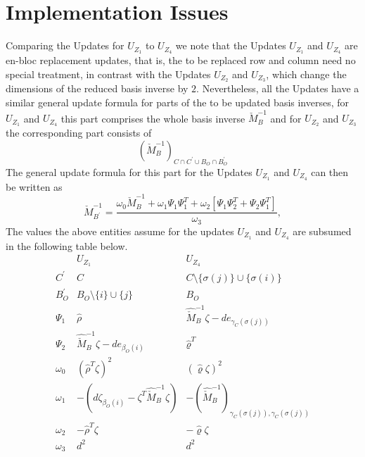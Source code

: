 \documentclass[a4paper]{article}
\begin{document}
\section{Implementation Issues}
Comparing the Updates for $U_{Z_{1}}$ to $U_{Z_{4}}$ we note that the Updates
$U_{Z_{1}}$ and $U_{Z_{4}}$ are en-bloc replacement updates, that is, the to be
replaced row and column need no special treatment, in contrast with the Updates
$U_{Z_{2}}$ and $U_{Z_{3}}$, which change the dimensions of the reduced basis
inverse by $2$. Nevertheless, all the Updates have a similar general update
formula for parts of the to be updated basis inverses,
for $U_{Z_{1}}$ and $U_{Z_{4}}$ this part comprises the whole
basis inverse $\check{M}_{B}^{-1}$ and for $U_{Z_{2}}$
and $U_{Z_{3}}$ the corresponding part consists of  
\begin{equation}
\left(
 \check{M}_{B}^{-1}
\right)_{C \cap C^{\prime} \cup B_{O} \cap B_{O}^{\prime}}
\end{equation}
The general update formula for this part for the Updates
$U_{Z_{1}}$ and $U_{Z_{4}}$ can then be written as 
\begin{equation}
\check{M}_{B^{\prime}}^{-1}
=
\frac{
\omega_{0}\check{M}_{B}^{-1}
+\omega_{1}\Psi_{1}\Psi_{1}^{T}
+\omega_{2}\left[\Psi_{1}\Psi_{2}^{T}+\Psi_{2}\Psi_{1}^{T}\right]
}{\omega_{3}},
\end{equation}
The values the above entities assume for the updates $U_{Z_{1}}$ and
$U_{Z_{4}}$ are subsumed in the following table below.
\begin{equation}
\begin{array}{c|cc}
& U_{Z_{1}} & U_{Z_{4}} \\
\hline
C^{\prime}
& C
& C \setminus \{\sigma(j)\} \cup \{\sigma(i)\}
\\
B_{O}^{\prime}
& B_{O} \setminus \{i\} \cup \{j\}
& B_{O}
\\
\Psi_{1}
& \hat{\rho}
& \hat{\check{M}}_{B}^{-1}\zeta-de_{\gamma_{C}(\sigma(j))}
\\
\Psi_{2}
& \hat{\check{M}}_{B}^{-1}\zeta-de_{\beta_{O}(i)}
& \hat{\varrho}^{T}
\\
\omega_{0}
& \left(\hat{\rho}^{T}\zeta\right)^{2}
& \left(\hat{\varrho}\zeta\right)^{2}
\\
\omega_{1}
& -\left(
   d\zeta_{\beta_{O}(i)}-\zeta^{T}\hat{\check{M}}_{B}^{-1}\zeta
  \right) 
& -\left(
   \hat{\check{M}}_{B}^{-1}
  \right)_{\gamma_{C}(\sigma(j)), \gamma_{C}(\sigma(j))} 
\\
\omega_{2}
& -\hat{\rho}^{T}\zeta
& -\hat{\varrho}\zeta
\\
\omega_{3}
& d^{2}
& d^{2}
\end{array}
\end{equation}
 
\end{document}
